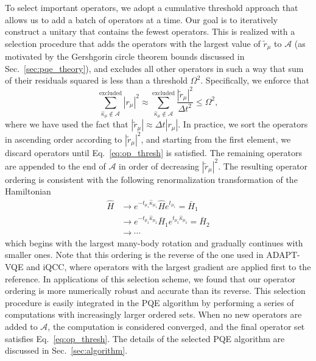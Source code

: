 \documentclass[aps,prx, reprint]{revtex4-2}
\providecommand{\norm}[1]{| #1 |^{2}}
\providecommand{\norm}[1]{\lVert#1\rVert}
\begin{document}
To select important operators, we adopt a cumulative threshold approach that allows us to add a batch of operators at a time.
Our goal is to iteratively construct a unitary that contains the fewest operators.
This is realized with a selection procedure that adds the operators with the largest value of $\tilde{r}_\mu$ to $\mathcal{A}$ (as motivated by the Gershgorin circle theorem bounds discussed in Sec.~\ref{sec:pqe_theory}), and excludes all other operators in such a way that sum of their residuals squared is less than a threshold $\Omega^2$.
Specifically, we enforce that
\begin{equation}
\sum_{\hat{\kappa}_\mu \notin \mathcal{A}}^\text{excluded} \norm{r_\mu} \approx \sum_{\hat{\kappa}_\mu \notin \mathcal{A}}^\text{excluded} \frac{\norm{\tilde{r}_\mu}}{\Delta t^2} \leq \Omega^2,
\label{eq:op_thresh}
\end{equation}
where we have used the fact that $|\tilde{r}_\mu| \approx \Delta t | r_\mu|$.
In practice, we sort the operators in ascending order according to $\norm{\tilde{r}_\mu}$, and starting from the first element, we discard operators until Eq.~\eqref{eq:op_thresh} is satisfied. The remaining operators are appended to the end of $\mathcal{A}$ in order of decreasing $\norm{\tilde{r}_\mu}$.
The resulting operator ordering is consistent with the following renormalization transformation of the Hamiltonian
\begin{equation}
\begin{split}
\hat{H} & \rightarrow
 e^{-t_{\mu_{1}} \hat{\kappa}_{\mu_{1}}} \hat{H} e^{t_{\mu_1}} = \bar{H}_1 \\
& \rightarrow
 e^{-t_{\mu_{2}} \hat{\kappa}_{\mu_{2}}} \bar{H}_1 e^{t_{\mu_{2}} \hat{\kappa}_{\mu_{2}}} = \bar{H}_2 \\
& \rightarrow\cdots
\end{split}
\end{equation}
which begins with the largest many-body rotation and gradually continues with smaller ones.
Note that this ordering is the reverse of the one used in ADAPT-VQE and iQCC, where operators with the largest gradient are applied first to the reference.
In applications of this selection scheme, we found that our operator ordering is more numerically robust and accurate than its reverse.
This selection procedure is easily integrated in the PQE algorithm by performing a series of computations with increasingly larger ordered sets.
When no new operators are added to $\mathcal{A}$, the computation is considered converged, and the final operator set satisfies Eq.~\eqref{eq:op_thresh}.
The details of the selected PQE algorithm are discussed in Sec.~\ref{sec:algorithm}.
\end{document}
